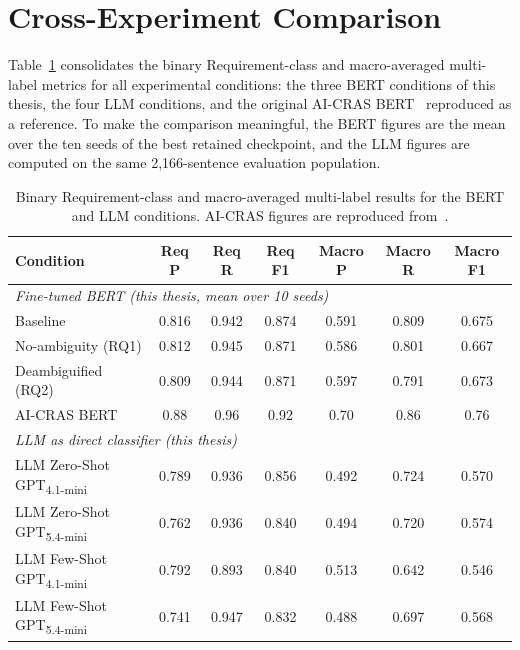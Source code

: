 \section{Cross-Experiment Comparison}
\label{sec:cross-experiment}

Table~\ref{tab:cross_experiment} consolidates the binary Requirement-class and macro-averaged multi-label metrics for all experimental conditions: the three BERT conditions of this thesis, the four LLM conditions, and the original AI-CRAS BERT~\cite{casalicchio2024aicras} reproduced as a reference. To make the comparison meaningful, the BERT figures are the mean over the ten seeds of the best retained checkpoint, and the LLM figures are computed on the same 2,166-sentence evaluation population.

\begin{table}[h]
\centering
\caption{Binary Requirement-class and macro-averaged multi-label results for the BERT and LLM conditions. AI-CRAS figures are reproduced from~\cite{casalicchio2024aicras}.}
\label{tab:cross_experiment}
\footnotesize
\begin{tabular}{lcccccc}
\toprule
Condition & Req P & Req R & Req F1 & Macro P & Macro R & Macro F1 \\
\midrule
\multicolumn{7}{l}{\textit{Fine-tuned BERT (this thesis, mean over 10 seeds)}} \\
\midrule
Baseline              & 0.816 & 0.942 & 0.874 & 0.591 & 0.809 & 0.675 \\
No-ambiguity (RQ1)    & 0.812 & 0.945 & 0.871 & 0.586 & 0.801 & 0.667 \\
Deambiguified (RQ2)   & 0.809 & 0.944 & 0.871 & 0.597 & 0.791 & 0.673 \\
\midrule
AI-CRAS BERT~\cite{casalicchio2024aicras}      & 0.88 & 0.96 & 0.92 & 0.70 & 0.86 & 0.76 \\
\midrule
\multicolumn{7}{l}{\textit{LLM as direct classifier (this thesis)}} \\
\midrule
LLM Zero-Shot GPT\textsubscript{4.1-mini}       & 0.789 & 0.936 & 0.856 & 0.492 & 0.724 & 0.570 \\
LLM Zero-Shot GPT\textsubscript{5.4-mini}       & 0.762 & 0.936 & 0.840 & 0.494 & 0.720 & 0.574 \\
LLM Few-Shot GPT\textsubscript{4.1-mini}       & 0.792 & 0.893 & 0.840 & 0.513 & 0.642 & 0.546 \\
LLM Few-Shot GPT\textsubscript{5.4-mini}       & 0.741 & 0.947 & 0.832 & 0.488 & 0.697 & 0.568 \\
\bottomrule
\end{tabular}
\end{table}

